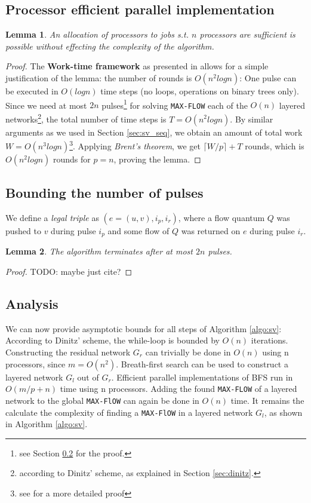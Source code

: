 \documentclass[a4paper,10pt, twocolumn]{article}
\newtheorem{lemma}{Lemma}
\begin{document}
\subsection{Processor efficient parallel implementation}
\label{sec:sv_nr_procs}
\begin{lemma}
An allocation of processors to jobs s.t. $n$ processors are sufficient is possible without effecting the complexity of the algorithm. 
\end{lemma}
\begin{proof}
The \textbf{Work-time framework} as presented in \cite{vishkin92} allows for a simple justification of the lemma: the number of rounds is $O(n^2 log n)$: One pulse can be executed in $O(log n)$ time steps (no loops, operations on binary trees only). Since we need at most $2n$ pulses\footnote{see Section \ref{sec:sv_nr_pulses} for the proof.} for solving \lstinline|MAX-FLOW| each of the $O(n)$ layered networks\footnote{according to Dinitz' scheme, as explained in Section \ref{sec:dinitz}.}, the total number of time steps is $T = O(n^{2} log n)$. By similar arguments as we used in Section \ref{sec:sv_seq}, we obtain an amount of total work $W = O(n^{3} log n)$\footnote{see \cite{yossi81} for a more detailed proof}. Applying \emph{Brent's theorem}\cite{Brent74}, we get $\lceil W/p \rceil + T$ rounds, which is $O(n^{2} log n)$ rounds for $p=n$, proving the lemma.
\end{proof}

\subsection{Bounding the number of pulses}
\label{sec:sv_nr_pulses}
We define a \emph{legal triple} as $(e =(u,v), i_p, i_r)$, where a flow quantum $Q$ was pushed to $v$ during pulse $i_p$ and some flow of $Q$ was returned on $e$ during pulse $i_r$. 

\begin{lemma}
The algorithm terminates after at most $2n$ pulses.\cite{yossi81}
\end{lemma}
\label{lemma:bounding}
\begin{proof}
TODO: maybe just cite?
\end{proof} 

\subsection{Analysis}
\label{sec:sv_analysis}
We can now provide asymptotic bounds for all steps of Algorithm \ref{algo:sv}: According to Dinitz' scheme, the while-loop is bounded by $O(n)$ iterations. Constructing the residual network $G_r$ can trivially be done in $O(n)$ using n processors, since $m = O(n^{2})$. Breath-first search can be used to construct a layered network $G_l$ out of $G_r$. Efficient parallel implementations of BFS run in $O(m/p +n)$ time using n processors. Adding the found \lstinline|MAX-FLOW| of a layered network to the global \lstinline|MAX-FlOW| can again be done in $O(n)$ time. It remains the calculate the complexity of finding a \lstinline|MAX-FlOW| in a layered network $G_l$, as shown in Algorithm \ref{algo:sv}.
\end{document}
